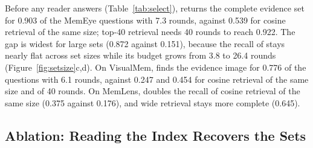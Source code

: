 \begin{table}[t]
\centering
\small
\setlength{\tabcolsep}{3.2pt}
\renewcommand{\arraystretch}{1.06}
\caption{\textbf{Selection without answering.} Full-set recall (FSR, Eq.~\ref{eq:fsr}) and opened rounds (Rds.); ``$\ge$4'' restricts FSR to the 86 MemEye questions with at least four gold rounds. ``Same size'' opens as many rounds as \qss{}.}
\label{tab:select}
\end{table}

Before any reader answers (Table~\ref{tab:select}), \qss{} returns the complete evidence set for 0.903 of the MemEye questions with 7.3 rounds, against 0.539 for cosine retrieval of the same size; top-40 retrieval needs 40 rounds to reach 0.922. The gap is widest for large sets (0.872 against 0.151), because the recall of \qss{} stays nearly flat across set sizes while its budget grows from 3.8 to 26.4 rounds (Figure~\ref{fig:setsize}c,d). On VisualMem, \qss{} finds the evidence image for 0.776 of the questions with 6.1 rounds, against 0.247 and 0.454 for cosine retrieval of the same size and of 40 rounds. On MemLens, \qss{} doubles the recall of cosine retrieval of the same size (0.375 against 0.176), and wide retrieval stays more complete (0.645).

\subsection{Ablation: Reading the Index Recovers the Sets}
\label{sec:res-ablation}



